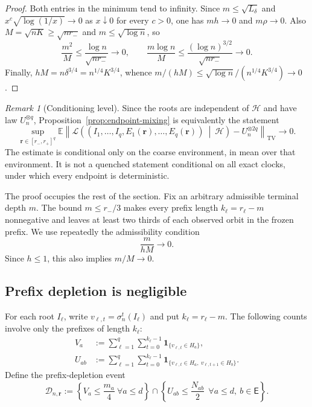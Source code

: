 \documentclass[11pt]{article}
\newcommand{\E}{\mathbb E}
\newcommand{\1}{\mathbf 1}
\newcommand{\TV}{\mathrm{TV}}
\newcommand{\cH}{\mathcal H}
\newcommand{\cD}{\mathcal D}
\newcommand{\cL}{\mathcal L}
\theoremstyle{definition}
\theoremstyle{remark}
\newtheorem{remark}[theorem]{Remark}
\begin{document}
\begin{proof}
Both entries in the minimum tend to infinity.  Since
$m\le\sqrt{L_\delta}$ and
$x^c\sqrt{\log(1/x)}\to0$ as $x\downarrow0$ for every $c>0$, one has
$mh\to0$ and $m\rho\to0$.  Also
$M=\sqrt{nK}\ge\sqrt{nr_-}$ and $m\le\sqrt{\log n}$, so
\[
 \frac{m^2}{M}\le\frac{\log n}{\sqrt{nr_-}}\to0,
 \qquad
 \frac{m\log n}{M}\le
 \frac{(\log n)^{3/2}}{\sqrt{nr_-}}\to0.
\]
Finally,
$hM=n\delta^{3/4}=n^{1/4}K^{3/4}$, whence
$m/(hM)\le\sqrt{\log n}/(n^{1/4}K^{3/4})\to0$.
\end{proof}

\begin{remark}[Conditioning level]
Since the roots are independent of $\cH$ and have law $U_n^{\otimes q}$,
Proposition~\ref{prop:endpoint-mixing} is equivalently the statement
\[
 \sup_{\mathbf r\in[r_-,r_+]^q}
 \E\left\|
  \cL\left(
   (I_1,\dots,I_q,E_1(\mathbf r),\dots,E_q(\mathbf r))
   \ \middle|\ \cH
  \right)-U_n^{\otimes 2q}
 \right\|_{\TV}\longrightarrow0.
\]
The estimate is conditional only on the coarse environment, in mean over
that environment.  It is not a quenched statement conditional on all
exact clocks, under which every endpoint is deterministic.
\end{remark}

The proof occupies the rest of the section.  Fix an arbitrary admissible
terminal depth $m$.  The bound $m\le r_-/3$ makes every prefix length
$k_\ell=r_\ell-m$ nonnegative and leaves at least two thirds of each
observed orbit in the frozen prefix.  We use repeatedly the admissibility
condition
\begin{equation}\label{eq:m-over-hM}
 \frac{m}{hM}\longrightarrow0.
\end{equation}
Since $h\le1$, this also implies $m/M\to0$.

\subsection{Prefix depletion is negligible}

For each root $I_\ell$, write
$v_{\ell,t}=\sigma_n^t(I_\ell)$ and put $k_\ell=r_\ell-m$.
The following counts involve only the prefixes of length $k_\ell$:
\begin{align*}
 V_a&:=\sum_{\ell=1}^q\sum_{t=0}^{k_\ell-1}
       \1_{\{v_{\ell,t}\in H_a\}},\\
 U_{ab}&:=\sum_{\ell=1}^q\sum_{t=0}^{k_\ell-1}
       \1_{\{v_{\ell,t}\in H_a,\ v_{\ell,t+1}\in H_b\}}.
\end{align*}
Define the prefix-depletion event
\begin{equation}\label{eq:D-event}
 \cD_{n,\mathbf r}:=
 \left\{V_a\leq\frac{m_a}{4}\ \forall a\leq d\right\}
 \cap
 \left\{U_{ab}\leq\frac{N_{ab}}2\
       \ \forall a\leq d,\ b\in\mathsf E\right\}.
\end{equation}
\end{document}
